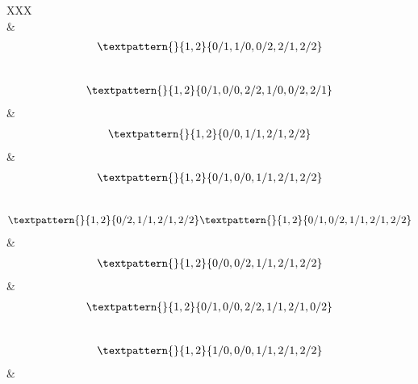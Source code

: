 \begin{center}
\begin{longtabu}[l]{XXX}
\begin{equation}
	\label{cls:150}
\end{equation}
&
\begin{equation}
	\begin{gathered}
		\textpattern{}{1,2}{0/1,1/0,0/2,2/1,2/2}
	\end{gathered}
	\label{cls:151}
\end{equation}
\\
\begin{equation}
	\begin{gathered}
		\textpattern{}{1,2}{0/1,0/0,2/2,1/0,0/2,2/1}
	\end{gathered}
	\label{cls:152}
\end{equation}
&
\begin{equation}
	\begin{gathered}
		\textpattern{}{1,2}{0/0,1/1,2/1,2/2}
	\end{gathered}
	\label{cls:153}
\end{equation}
&
\begin{equation}
	\begin{gathered}
		\textpattern{}{1,2}{0/1,0/0,1/1,2/1,2/2}
	\end{gathered}
	\label{cls:154}
\end{equation}
\\
\begin{equation}
	\begin{gathered}
		\textpattern{}{1,2}{0/2,1/1,2/1,2/2}
		\textpattern{}{1,2}{0/1,0/2,1/1,2/1,2/2}
	\end{gathered}
	\label{cls:155}
\end{equation}
&
\begin{equation}
	\begin{gathered}
		\textpattern{}{1,2}{0/0,0/2,1/1,2/1,2/2}
	\end{gathered}
	\label{cls:156}
\end{equation}
&
\begin{equation}
	\begin{gathered}
		\textpattern{}{1,2}{0/1,0/0,2/2,1/1,2/1,0/2}
	\end{gathered}
	\label{cls:157}
\end{equation}
\\
\begin{equation}
	\begin{gathered}
		\textpattern{}{1,2}{1/0,0/0,1/1,2/1,2/2}
	\end{gathered}
	\label{cls:158}
\end{equation}
&
\begin{equation}

\end{equation}
\end{longtabu}
\end{center}
